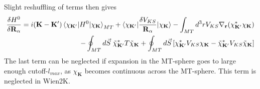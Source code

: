\documentclass[aps,prb,floatfix,epsfig,singlecolumn,showpacs,preprintnumbers]{revtex4}
\newcommand{\vR}{{\mathbf{R}}}
\renewcommand{\vr}{{\mathbf{r}}}
\newcommand{\vk}{{\mathbf{k}}}
\newcommand{\vK}{{\mathbf{K}}}
\renewcommand{\d}{\delta}
\begin{document}
Slight reshuffling of terms then gives
\begin{eqnarray}
\frac{\delta H^0}{\delta\vR_\alpha}=
i(\vK-\vK')\braket{\chi_{\vK'}|H^0|\chi_{\vK}}_{MT} 
+\braket{\chi_{\vK'}|\frac{\delta  V_{KS}}{\vR_\alpha}|\chi_{\vK}}
-\int_{MT}d^3r V_{KS} \nabla_\vr (\chi^*_{\vK'} \chi_{\vK}) 
\nonumber\\
- \oint _{MT} d\vec{S}\; \tilde{\chi}^*_{\vK'} T \tilde{\chi}_{\vK}
+\oint_{MT} d\vec{S} \left[\chi^*_{\vK'} V_{KS} \chi_{\vK}-\tilde{\chi}^*_{\vK'} V_{KS} \tilde{\chi}_{\vK}\right]
\end{eqnarray}
The last term can be neglected if expansion in the MT-sphere goes
to large enough cutoff-$l_{max}$, as $\chi_{\vK}$ becomes continuous across
the MT-sphere. This term is neglected in Wien2K.
\end{document}
